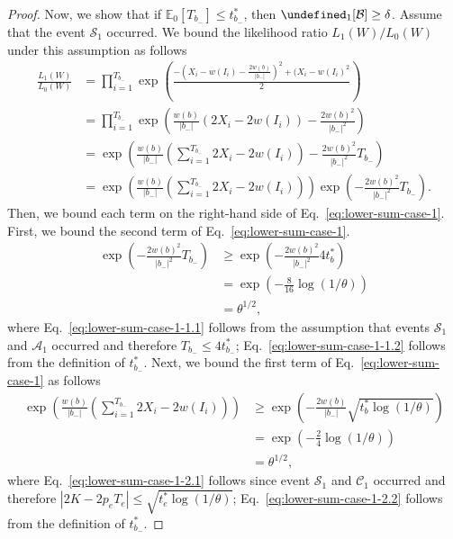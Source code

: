 \documentclass{article}
\newcommand{\E}{\mathbb E}
\let\Pr\undefined
\DeclareMathOperator{\Pr}{Pr}
\begin{document}
\begin{spacing}{1.1}
\begin{proof}
Now, we show that if $\E_0[T_{b_-}] \le t_{b_-}^*$, then $\Pr_1[\mathcal B] \ge \delta$.
Assume that the event $\mathcal S_1$ occurred.
We bound the likelihood ratio $L_1(W)/L_0(W)$ under this assumption as follows
\begin{align}
  \frac{L_1(W)}{L_0(W)} 
  &= \prod_{i=1}^{T_{b_-}}
  \exp\left(\frac{-\left(X_i-w(I_i)-\frac{2w(b)}{|b_-|}\right)^2+(X_i-w(I_i)^2}{2}\right) \nonumber \\
  &= \prod_{i=1}^{T_{b_-}}
  \exp\left(\frac{w(b)}{|b_-|}(2X_i-2w(I_i))-\frac{2w(b)^2}{|b_-|^2}\right) \nonumber \\
  &= \exp\left(\frac{w(b)}{|b_-|}\left(\sum_{i=1}^{T_{b_-}}2X_i-2w(I_i)\right)-\frac{2w(b)^2}{|b_-|^2}T_{b_-}\right) \nonumber \\
  &= \exp\left(\frac{w(b)}{|b_-|}\left(\sum_{i=1}^{T_{b_-}}2X_i-2w(I_i)\right)\right)\exp\left(-\frac{2w(b)^2}{|b_-|^2}T_{b_-}\right) \label{eq:lower-sum-case-1}.
\end{align}
Then, we bound each term on the right-hand side of Eq.~\eqref{eq:lower-sum-case-1}.
First, we bound the second term of Eq.~\eqref{eq:lower-sum-case-1}.
\begin{align}
	\exp\left(-\frac{2w(b)^2}{|b_-|^2} T_{b_-}\right) 
	 &\ge \exp\left(-\frac{2w(b)^2}{|b_-|^2} 4t_b^*\right) \label{eq:lower-sum-case-1-1.1} \\
     &=\exp\left(-\frac{8}{16}\log(1/\theta)\right) \label{eq:lower-sum-case-1-1.2}\\
     &= \theta^{1/2}\label{eq:lower-sum-case-1-1.3},
\end{align}
where Eq.~\eqref{eq:lower-sum-case-1-1.1} follows from the assumption that events $\mathcal S_1$ and $\mathcal A_1$ occurred and therefore $T_{b_-} \le 4t_{b_-}^*$; 
Eq.~\eqref{eq:lower-sum-case-1-1.2} follows from the definition of $t_{b_-}^*$.
Next, we bound the first term of Eq.~\eqref{eq:lower-sum-case-1} as follows
\begin{align}
	\exp\left(\frac{w(b)}{|b_-|}\left(\sum_{i=1}^{T_{b_-}}2X_i-2w(I_i)\right)\right)
	&\ge \exp\left(-\frac{2w(b)}{|b_-|}\sqrt{t_b^*\log(1/\theta)}\right) \label{eq:lower-sum-case-1-2.1}\\
    & = \exp\left(-\frac{2}{4}\log(1/\theta)\right) \label{eq:lower-sum-case-1-2.2}\\
    &=\theta^{1/2},  \label{eq:lower-sum-case-1-2.3}
\end{align}
where Eq.~\eqref{eq:lower-sum-case-1-2.1} follows since event $\mathcal S_1$ and $\mathcal C_1$ occurred and therefore $|2K-2p_eT_e| \le \sqrt{t_e^*\log(1/\theta)}$; 
Eq.~\eqref{eq:lower-sum-case-1-2.2} follows from the definition of $t_{b_-}^*$.


\end{proof}
\end{spacing}
\end{document}
